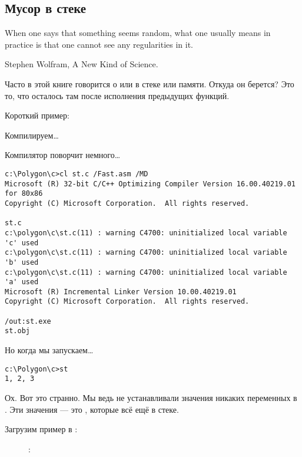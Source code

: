 \subsection{Мусор в стеке}
\label{noise_in_stack}

\epigraph{When one says that something seems random, what one usually
means in practice is that one cannot see any regularities in it.}{Stephen Wolfram, A New Kind of Science.}

Часто в этой книге говорится о  или  в стеке или памяти.
Откуда он берется?
Это то, что осталось там после исполнения предыдущих функций.

Короткий пример:



Компилируем\dots



Компилятор поворчит немного\dots

\begin{lstlisting}
c:\Polygon\c>cl st.c /Fast.asm /MD
Microsoft (R) 32-bit C/C++ Optimizing Compiler Version 16.00.40219.01 for 80x86
Copyright (C) Microsoft Corporation.  All rights reserved.

st.c
c:\polygon\c\st.c(11) : warning C4700: uninitialized local variable 'c' used
c:\polygon\c\st.c(11) : warning C4700: uninitialized local variable 'b' used
c:\polygon\c\st.c(11) : warning C4700: uninitialized local variable 'a' used
Microsoft (R) Incremental Linker Version 10.00.40219.01
Copyright (C) Microsoft Corporation.  All rights reserved.

/out:st.exe
st.obj
\end{lstlisting}

Но когда мы запускаем\dots

\begin{lstlisting}
c:\Polygon\c>st
1, 2, 3
\end{lstlisting}

Ох. Вот это странно. Мы ведь не устанавливали значения никаких переменных в . 
Эти значения --- это , которые всё ещё в стеке.

\clearpage
Загрузим пример в \olly:

\begin{figure}[H]
\centering
{}
\caption{\olly: }
\label{fig:stack_noise_olly1}
\end{figure}

